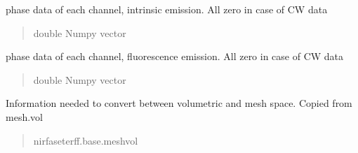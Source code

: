 \documentclass[letterpaper,10pt,english]{sphinxmanual}
\begin{document}
\begin{fulllineitems}
\begin{fulllineitems}
\begin{quote}
\begin{description}
\end{description}\end{quote}

\end{fulllineitems}


\begin{fulllineitems}
\label{\detokenize{_autosummary/nirfasterff.base.data.FLdata:nirfasterff.base.data.FLdata.phasemm}}
\pysigstartsignatures
\pysigline
{}
\pysigstopsignatures
\sphinxAtStartPar
phase data of each channel, intrinsic emission. All zero in case of CW data
\begin{quote}\begin{description}
\sphinxAtStartPar
double Numpy vector

\end{description}\end{quote}

\end{fulllineitems}


\begin{fulllineitems}
\label{\detokenize{_autosummary/nirfasterff.base.data.FLdata:nirfasterff.base.data.FLdata.phasefl}}
\pysigstartsignatures
\pysigline
{}
\pysigstopsignatures
\sphinxAtStartPar
phase data of each channel, fluorescence emission. All zero in case of CW data
\begin{quote}\begin{description}
\sphinxAtStartPar
double Numpy vector

\end{description}\end{quote}

\end{fulllineitems}


\begin{fulllineitems}
\label{\detokenize{_autosummary/nirfasterff.base.data.FLdata:nirfasterff.base.data.FLdata.vol}}
\pysigstartsignatures
\pysigline
{}
\pysigstopsignatures
\sphinxAtStartPar
Information needed to convert between volumetric and mesh space. Copied from mesh.vol
\begin{quote}\begin{description}
\sphinxAtStartPar
nirfaseterff.base.meshvol


\end{description}
\end{quote}
\end{fulllineitems}
\end{fulllineitems}
\end{document}

